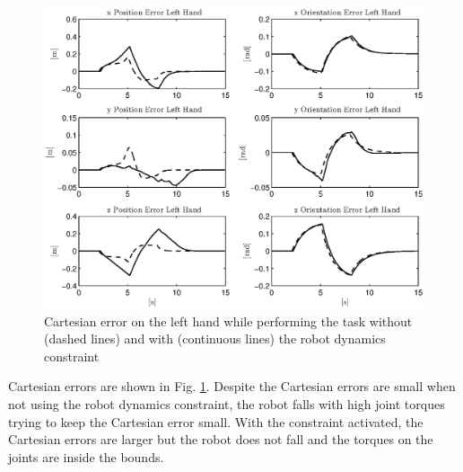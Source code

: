 \begin{figure}[htb] 
\centering 
\includegraphics[width=\textwidth]{images/cartesian_error.eps} 
\caption{Cartesian error on the left hand while performing the task without (dashed lines) and with (continuous lines) the robot dynamics constraint} 
\label{cartesian_error}
\end{figure}

Cartesian errors are shown in Fig. \ref{cartesian_error}. Despite the Cartesian errors are small when not using the robot dynamics constraint, the robot falls with high joint torques trying to keep the Cartesian error small. With the constraint activated, the Cartesian errors are larger but the robot does not fall and the torques on the joints are inside the bounds. 

